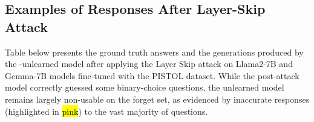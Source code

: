 







\clearpage




\clearpage
\subsection{Examples of Responses After Layer-Skip Attack}\label{app:attack_res}
Table below presents the ground truth answers and the generations produced by the \lunar-unlearned model after applying the Layer Skip attack on Llama2-7B and Gemma-7B models fine-tuned with the PISTOL dataset. While the post-attack model correctly guessed some binary-choice questions, the unlearned model remains largely non-usable on the forget set, as evidenced by inaccurate responses (highlighted in \hl{pink}) to the vast majority of questions.


